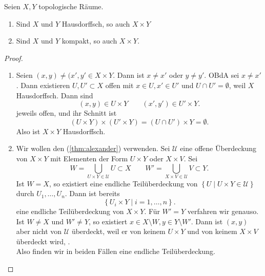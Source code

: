 \begin{theorem}[Produkteigenschaften]\label{thm:produkte-erhalten-hausdorff-und-kompaktheit}
    Seien $X,Y$ topologische Räume.
\begin{enumerate}[1)]
        \item Sind $X$ und  $Y$ Hausdorffsch, so auch  $X\times Y$
        \item Sind $X$ und $Y$ kompakt, so auch  $X\times Y$.
    \end{enumerate}
\end{theorem}
\begin{proof}
    \begin{enumerate}[1)]
        \item Seien $(x,y) \neq  (x',y' \in X\times Y$. Dann ist $x\neq x'$ oder $y\neq y'$. OBdA sei $x\neq x'$. Dann existieren $U,U'\subset X$ offen mit $x\in U, x'\in U'$ und $U\cap U' = \emptyset$, weil $X$ Hausdorffsch. Dann sind
            \[
                (x,y)           \in  U\times Y \qquad (x',y') \in U' \times Y
            .\] 
    jeweils offen, und ihr Schnitt ist
    \[
        (        U\times Y) \times (U'\times Y) = (U\cap U') \times Y = \emptyset
    .\] 
    Also ist $X\times Y$ Hausdorffsch.
\item Wir wollen den  (\ref{thm:alexander}) verwenden. Sei $\mathcal{U}$ eine offene Überdeckung von  $X\times Y$ mit Elementen der Form $U\times Y$ oder $X\times V$. Sei
    \[
    W = \bigcup_{U\times Y \in \mathcal{U}} U \subset X \qquad W' = \bigcup_{X\times V \in \mathcal{U}} V \subset Y  
    .\] 
    Ist $W = X$, so existiert eine endliche Teilüberdeckung von  $\left \{U \mid  U\times Y \in \mathcal{U}\right\} $ durch $U_1,\ldots,U_n$. Dann ist bereits
    \[
    \left \{U_i \times Y \mid  i=1,\ldots,n\right\} 
    .\] 
    eine endliche Teilüberdeckung von $X\times Y$. Für $W' = Y$ verfahren wir genauso. Ist  $W \neq  X$ und $W'\neq Y$, so existiert $x\in X \setminus W, y\in Y \setminus W'$. Dann ist $(x,y)$ aber nicht von  $\mathcal{U}$ überdeckt, weil er von keinem $U\times Y$ und von keinem $X\times V$ überdeckt wird, \contra. \\
    Also finden wir in beiden Fällen eine endliche Teilüberdeckung.
    \end{enumerate}
\end{proof}

